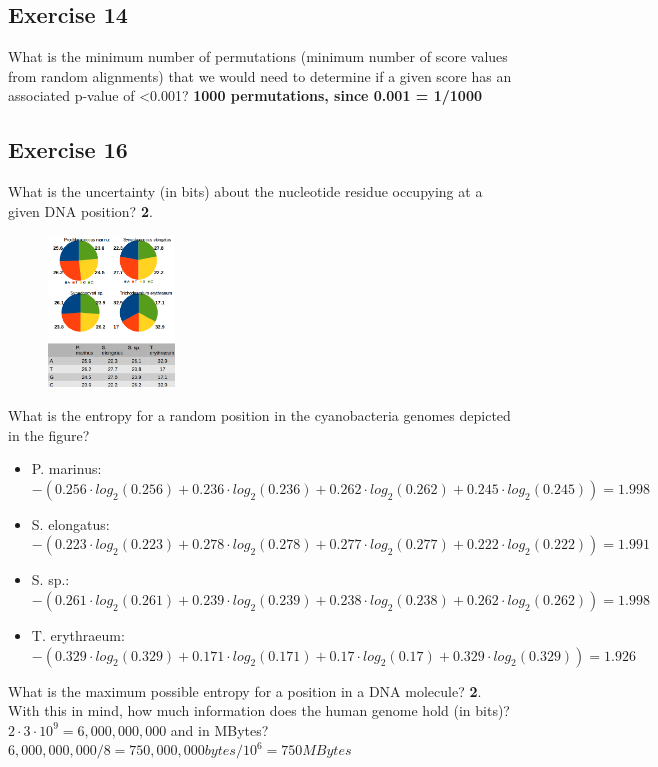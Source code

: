 \subsection{Exercise 14}
What is the minimum number of permutations (minimum number of score values from random alignments) that we would need to determine if a given score has an associated p-value of <0.001? \textbf{ 1000 permutations, since 0.001 = 1/1000}

\subsection{Exercise 16}
What is the uncertainty (in bits) about the nucleotide residue occupying at a given DNA position? \textbf{2}. 
\begin{figure}[htbp]
\centering
\includegraphics[width = 0.3\textwidth]{figs/exam-ex16.png}
\end{figure}
What is the entropy for a random position in the cyanobacteria genomes depicted in the figure?
\begin{itemize}
\item P. marinus: $-(0.256 \cdot log_2 (0.256) + 0.236 \cdot log_2(0.236) + 0.262 \cdot log_2 (0.262) + 0.245 \cdot log_2(0.245)) =  1.998 $
\item S. elongatus: $-(0.223 \cdot log_2 (0.223) + 0.278 \cdot log_2(0.278) + 0.277 \cdot log_2 (0.277) + 0.222 \cdot log_2(0.222)) =  1.991 $
\item S. sp.: $-(0.261 \cdot log_2 (0.261) + 0.239 \cdot log_2(0.239) + 0.238 \cdot log_2 (0.238) + 0.262 \cdot log_2(0.262)) =  1.998 $
\item T. erythraeum: $-(0.329 \cdot log_2 (0.329) + 0.171 \cdot log_2(0.171) + 0.17 \cdot log_2 (0.17) + 0.329 \cdot log_2(0.329)) =  1.926 $
\end{itemize}

What is the maximum possible entropy for a position in a DNA molecule? \textbf{2}. With this in mind, how much information does the human genome hold (in bits)? $2 \cdot 3 \cdot 10^9 = 6,000,000,000$ and in MBytes? $6,000,000,000 / 8 = 750,000,000 bytes / 10^6 = 750 MBytes$

